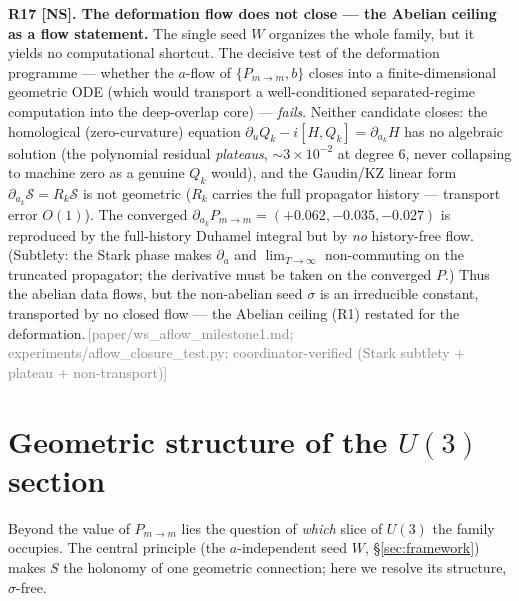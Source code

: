 \documentclass[aps,prd,reprint,nofootinbib]{revtex4-2}
\newcommand{\pnote}[1]{\textcolor{gray}{\footnotesize\,[#1]}}
\newcommand{\Scat}{\mathcal{S}}   %
\newcommand{\Pmid}{P_{m\to m}}   %
\begin{document}
\textbf{R17 [NS]. The deformation flow does not close --- the Abelian ceiling as a flow statement.}
The single seed $W$ organizes the whole family, but it yields no computational shortcut. The decisive
test of the deformation programme --- whether the $a$-flow of $\{\Pmid,b\}$ closes into a
finite-dimensional geometric ODE (which would transport a well-conditioned separated-regime computation
into the deep-overlap core) --- \emph{fails}. Neither candidate closes: the homological (zero-curvature)
equation $\partial_u Q_k-i[H,Q_k]=\partial_{a_k}H$ has no algebraic solution (the polynomial residual
\emph{plateaus}, $\sim3\times10^{-2}$ at degree $6$, never collapsing to machine zero as a genuine
$Q_k$ would), and the Gaudin/KZ linear form $\partial_{a_k}\Scat=R_k\Scat$ is not geometric ($R_k$
carries the full propagator history --- transport error $O(1)$). The converged
$\partial_{a_k}\Pmid=(+0.062,-0.035,-0.027)$ is reproduced by the full-history Duhamel integral but by
\emph{no} history-free flow. (Subtlety: the Stark phase makes $\partial_a$ and $\lim_{T\to\infty}$
non-commuting on the truncated propagator; the derivative must be taken on the converged $P$.) Thus the
abelian data flows, but the non-abelian seed $\sigma$ is an irreducible constant, transported by no
closed flow --- the Abelian ceiling (R1) restated for the deformation.\pnote{paper/ws\_aflow\_milestone1.md;
experiments/aflow\_closure\_test.py; coordinator-verified (Stark subtlety + plateau + non-transport)}

\section{Geometric structure of the $U(3)$ section}\label{sec:geom}
Beyond the value of $\Pmid$ lies the question of \emph{which} slice of $U(3)$ the family occupies. The
central principle (the $a$-independent seed $W$, \S\ref{sec:framework}) makes $S$ the holonomy of one
geometric connection; here we resolve its structure, $\sigma$-free.
\end{document}
